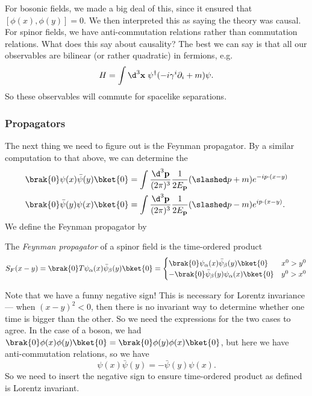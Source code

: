 \documentclass[a4paper]{article}
\begin{document}
For bosonic fields, we made a big deal of this, since it ensured that $[\phi(x), \phi(y)] = 0$. We then interpreted this as saying the theory was causal. For spinor fields, we have anti-commutation relations rather than commutation relations. What does this say about causality? The best we can say is that all our observables are bilinear (or rather quadratic) in fermions, e.g.
\[
  H = \int \d^3 \mathbf{x} \; \psi^\dagger (-i \gamma^i \partial_i + m) \psi.
\]
So these observables will commute for spacelike separations.


\subsubsection*{Propagators}
The next thing we need to figure out is the Feynman propagator. By a similar computation to that above, we can determine the 
\begin{align*}
  \brak{0} \psi(x) \bar\psi(y)\bket{0} &= \int \frac{\d^3 \mathbf{p}}{(2\pi)^3} \frac{1}{2E_\mathbf{p}}(\slashed p + m) e^{-ip\cdot (x - y)}\\
  \brak{0} \bar\psi(y) \psi(x)\bket{0} &= \int \frac{\d^3 \mathbf{p}}{(2\pi)^3} \frac{1}{2E_\mathbf{p}}(\slashed p - m) e^{ip\cdot (x - y)}.
\end{align*}
We define the Feynman propagator by
\begin{defi}
  The \emph{Feynman propagator} of a spinor field is the time-ordered product
  \[
    S_F(x - y) = \brak{0} T \psi_\alpha(x) \bar\psi_\beta(y)\bket{0} =
    \begin{cases}
      \brak{0}\psi_\alpha(x) \bar\psi_\beta(y)\bket{0} & x^0 > y^0\\
      -\brak{0} \bar\psi_\beta(y) \psi_\alpha(x) \bket{0} & y^0 > x^0
    \end{cases}
  \]
\end{defi}
Note that we have a funny negative sign! This is necessary for Lorentz invariance --- when $(x - y)^2 < 0$, then there is no invariant way to determine whether one time is bigger than the other. So we need the expressions for the two cases to agree. In the case of a boson, we had $\brak{0}\phi(x) \phi(y) \bket{0} = \brak{0} \phi(y) \phi(x)\bket{0}$, but here we have anti-commutation relations, so we have
\[
  \psi(x) \bar\psi(y) = - \bar\psi (y) \psi(x).
\]
So we need to insert the negative sign to ensure time-ordered product as defined is Lorentz invariant.
\end{document}
